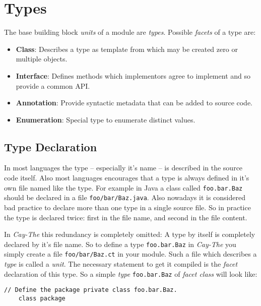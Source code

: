 \documentclass[11pt,a4paper]{report}
\begin{document}
\section{Types}


The base building block \textit{units} of a module are \textit{types}. Possible \textit{facets} of a type are:

\begin{itemize}
    \item \textbf{Class}: Describes a type as template from which may be created zero or multiple objects.
    \item \textbf{Interface}: Defines methods which implementors agree to implement and so provide a common API.
    \item \textbf{Annotation}: Provide syntactic metadata that can be added to source code.
    \item \textbf{Enumeration}: Special type to enumerate distinct values.
\end{itemize}

\subsection{Type Declaration}

In most languages the type -- especially it's name -- is described in the source code itself. Also most languages encourages that a type is always defined in it's own file named like the type. For example in Java a class called \texttt{foo.bar.Baz} should be declared in a file \texttt{foo/bar/Baz.java}. Also nowadays it is considered bad practice to declare more than one type in a single source file. So in practice the type is declared twice: first in the file name, and second in the file content.

In \textit{Cay-The} this redundancy is completely omitted: A type by itself is completely declared by it's file name. So to define a type \texttt{foo.bar.Baz} in \textit{Cay-The} you simply create a file \texttt{foo/bar/Baz.ct} in your module. Such a file which describes a \textit{type} is called a \textit{unit}. The necessary statement to get it compiled is the \textit{facet} declaration of this type. So a simple \textit{type} \texttt{foo.bar.Baz} of \textit{facet class} will look like:

\begin{lstlisting}[language=CayThe, title=foo/bar.Baz.ct]
    // Define the package private class foo.bar.Baz.
    class package
\end{lstlisting}
\end{document}
